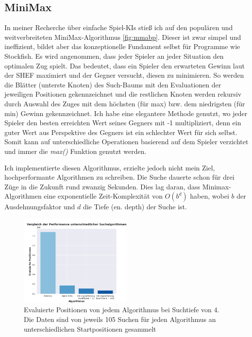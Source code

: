 \documentclass[
  manuscript=article,  %
  layout=publish,  %
  year=2023,
  volume=1,
]{extra/joas}
\begin{document}
\subsection{MiniMax}
In meiner Recherche über einfache Spiel-KIs stieß ich auf den populären und weitverbreiteten MiniMax-Algorithmus \cite{mman} \ref{fig:mmabp}. Dieser ist zwar simpel und ineffizient, bildet aber das konzeptionelle Fundament selbst für Programme wie Stockfish.
Es wird angenommen, dass jeder Spieler an jeder Situation den optimalen Zug spielt. Das bedeutet, dass ein Spieler den erwarteten Gewinn laut der SHEF maximiert und der Gegner versucht, diesen zu minimieren. So werden die Blätter (unterste Knoten) des Such-Baums mit den Evaluationen der jeweiligen Positionen gekennzeichnet und die restlichen Knoten werden rekursiv durch Auswahl des Zuges mit dem höchsten (für max) bzw. dem niedrigsten (für min) Gewinn gekennzeichnet. Ich habe eine elegantere Methode genutzt, wo jeder Spieler den besten erreichten Wert seines Gegners mit -1 multipliziert, denn ein guter Wert aus Perspektive des Gegners ist ein schlechter Wert für sich selbst. Somit kann auf unterschiedliche Operationen basierend auf dem Spieler verzichtet und immer die \textit{max()} Funktion genutzt werden.

Ich implementierte diesen Algorithmus, erzielte jedoch nicht mein Ziel, hochperformante Algorithmen zu schreiben. Die Suche dauerte schon für drei Züge in die Zukunft rund zwanzig Sekunden. Dies lag daran, dass Minimax-Algorithmen eine exponentielle Zeit-Komplexität von $O(b^d)$ haben, wobei $b$ der Ausdehnungsfaktor und $d$ die Tiefe (en. depth) der Suche ist.

\begin{figure}
    \centering
    \includegraphics[width={0.5\textwidth}]{imgs/comp.png}
    \captionsetup{justification=centering}
    \caption{Evaluierte Positionen von jedem Algorithmus bei Suchtiefe von 4.
    Die Daten sind von jeweils 105 Suchen für jeden Algorithmus an unterschiedlichen Startpositionen gesammelt}
    \label{fig:comp}
\end{figure}
\end{document}
